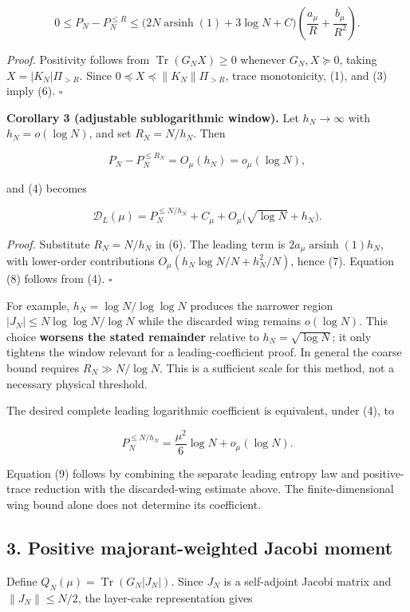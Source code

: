 \documentclass[
  10pt,
  a4paper,
]{article}
\begin{document}
\[
\boxed{0\le P_N-P_N^{\le R}
\le\bigl(2N\operatorname{arsinh}(1)+3\log N+C\bigr)
\left(\frac{a_\mu}{R}+\frac{b_\mu}{R^2}\right).}
\tag{6}
\]

\emph{Proof.} Positivity follows from \(\operatorname{Tr}(G_NX)\ge0\) whenever \(G_N,X\succeq0\), taking \(X=|K_N|\Pi_{>R}\). Since \(0\preceq X\preceq\|K_N\|\Pi_{>R}\), trace monotonicity, (1), and (3) imply (6). \(\square\)

\textbf{Corollary 3 (adjustable sublogarithmic window).} Let \(h_N\to\infty\) with \(h_N=o(\log N)\), and set \(R_N=N/h_N\). Then

\[
\boxed{P_N-P_N^{\le R_N}=O_\mu(h_N)=o_\mu(\log N),}
\tag{7}
\]

and (4) becomes

\[
\boxed{\mathcal D_L(\mu)=P_N^{\le N/h_N}+C_\mu
+O_\mu\bigl(\sqrt{\log N}+h_N\bigr).}
\tag{8}
\]

\emph{Proof.} Substitute \(R_N=N/h_N\) in (6). The leading term is \(2a_\mu\operatorname{arsinh}(1)h_N\), with lower-order contributions \(O_\mu(h_N\log N/N+h_N^2/N)\), hence (7). Equation (8) follows from (4). \(\square\)

For example, \(h_N=\log N/\log\log N\) produces the narrower region \(|J_N|\le N\log\log N/\log N\) while the discarded wing remains \(o(\log N)\). This choice \textbf{worsens the stated remainder} relative to \(h_N=\sqrt{\log N}\); it only tightens the window relevant for a leading-coefficient proof. In general the coarse bound requires \(R_N\gg N/\log N\). This is a sufficient scale for this method, not a necessary physical threshold.

The desired complete leading logarithmic coefficient is equivalent, under (4), to

\[
\boxed{P_N^{\le N/h_N}=\frac{\mu^2}{6}\log N+o_\mu(\log N).}
\tag{9}
\]

Equation (9) follows by combining the separate leading entropy law and positive-trace reduction with the discarded-wing estimate above. The finite-dimensional wing bound alone does not determine its coefficient.

\subsection{3. Positive majorant-weighted Jacobi moment}\label{positive-majorant-weighted-jacobi-moment}

Define \(Q_N(\mu)=\operatorname{Tr}(G_N|J_N|)\). Since \(J_N\) is a self-adjoint Jacobi matrix and \(\|J_N\|\le N/2\), the layer-cake representation gives
\end{document}
